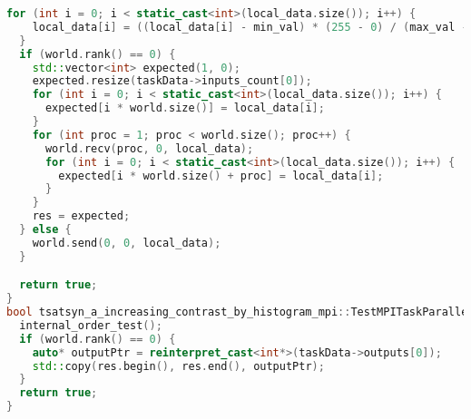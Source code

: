\documentclass[a4paper,12pt]{article}
\begin{document}
\begin{lstlisting}[language=C++,
    breaklines=true,       % Автоматический перенос строк
    basicstyle=\small\ttfamily, % Уменьшенный шрифт
    columns=fullflexible ]
  for (int i = 0; i < static_cast<int>(local_data.size()); i++) {
    local_data[i] = ((local_data[i] - min_val) * (255 - 0) / (max_val - min_val)) + 0;
  }
  if (world.rank() == 0) {
    std::vector<int> expected(1, 0);
    expected.resize(taskData->inputs_count[0]);
    for (int i = 0; i < static_cast<int>(local_data.size()); i++) {
      expected[i * world.size()] = local_data[i];
    }
    for (int proc = 1; proc < world.size(); proc++) {
      world.recv(proc, 0, local_data);
      for (int i = 0; i < static_cast<int>(local_data.size()); i++) {
        expected[i * world.size() + proc] = local_data[i];
      }
    }
    res = expected;
  } else {
    world.send(0, 0, local_data);
  }

  return true;
}
bool tsatsyn_a_increasing_contrast_by_histogram_mpi::TestMPITaskParallel::post_processing() {
  internal_order_test();
  if (world.rank() == 0) {
    auto* outputPtr = reinterpret_cast<int*>(taskData->outputs[0]);
    std::copy(res.begin(), res.end(), outputPtr);
  }
  return true;
}
\end{lstlisting}
\end{document}

